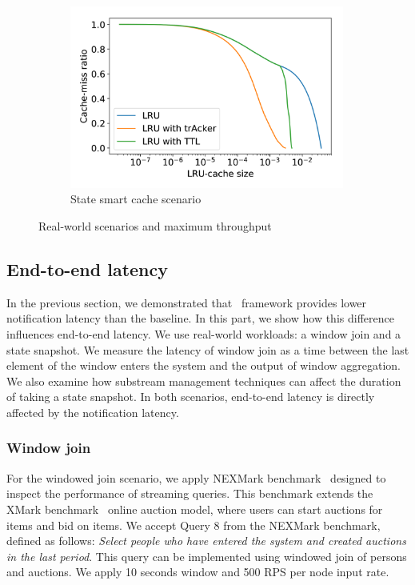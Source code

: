 \begin{figure}[t!]
\begin{subfigure}[b]{0.3\textwidth}
            \includegraphics[width=0.99\textwidth]{pics/dgc_lru_depth_search.png}
            \caption{State smart cache scenario}
            \label{fig:dgc_lru_depth_search}
    \end{subfigure}
    \caption{Real-world scenarios and maximum throughput}
    \label{various_experiments}
\end{figure}

\subsection{End-to-end latency}

In the previous section, we demonstrated that \tracker\ framework provides lower notification latency than the baseline. In this part, we show how this difference influences end-to-end latency. We use real-world workloads: a window join and a state snapshot. We measure the latency of window join as a time between the last element of the window enters the system and the output of window aggregation. We also examine how substream management techniques can affect the duration of taking a state snapshot. In both scenarios, end-to-end latency is directly affected by the notification latency. 


\subsubsection{Window join}
For the windowed join scenario, we apply NEXMark benchmark~\cite{tucker2008nexmark} designed to inspect the performance of streaming queries. This benchmark extends the XMark benchmark~\cite{schmidt2002xmark} online auction model, where users can start auctions for items and bid on items. We accept Query 8 from the NEXMark benchmark, defined as follows: {\em Select people who have entered the system and created auctions in the last period}. This query can be implemented using windowed join of persons and auctions. We apply 10 seconds window and 500 RPS per node input rate.

